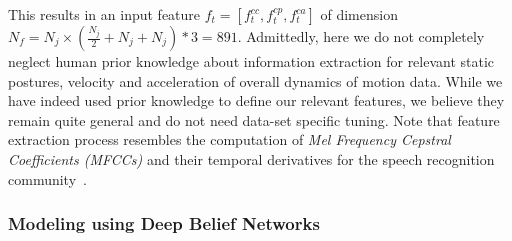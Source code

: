 This results in an input feature $f_t=[f^{cc}_t, f^{cp}_t, f^{ca}_t]$ of dimension $N_f=N_j \times( \frac{ N_j}{2} + N_j + N_j)*\mathit{3}=891$.
Admittedly, here we do not completely neglect human prior knowledge about information extraction for relevant static postures, velocity and acceleration of overall dynamics of motion data.
While we have indeed used prior knowledge to define our relevant features, we believe they remain quite general and do not need data-set specific tuning.
Note that feature extraction process resembles the computation of \emph{Mel Frequency Cepstral Coefficients (MFCCs)} and their temporal derivatives for the speech recognition community~\cite{mohamed2012acoustic}.

\subsubsection{Modeling \randomvariableSK{} using Deep Belief Networks}



